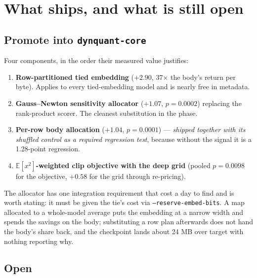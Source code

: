\documentclass[11pt]{article}
\newcommand{\x}{\texorpdfstring{$\times$}{x}}
\newcommand{\code}[1]{\texttt{#1}}
\begin{document}
\section{What ships, and what is still open}

\subsection{Promote into \code{dynquant-core}}

Four components, in the order their measured value justifies:

\begin{enumerate}[leftmargin=1.4em]
\item \textbf{Row-partitioned tied embedding} ($+2.90$, 37\x{} the body's return per byte). Applies
to every tied-embedding model and is nearly free in metadata.
\item \textbf{Gauss--Newton sensitivity allocator} ($+1.07$, $p = 0.0002$) replacing the
rank-product scorer. The cleanest substitution in the phase.
\item \textbf{Per-row body allocation} ($+1.04$, $p = 0.0001$) --- \emph{shipped together with its
shuffled control as a required regression test}, because without the signal it is a 1.28-point
regression.
\item \textbf{$\mathbb{E}[x^2]$-weighted clip objective with the deep grid} (pooled $p = 0.0098$
for the objective, $+0.58$ for the grid through re-pricing).
\end{enumerate}

The allocator has one integration requirement that cost a day to find and is worth stating: it must
be given the tie's cost via \code{--reserve-embed-bits}. A map allocated to a whole-model average
puts the embedding at a narrow width and spends the savings on the body; substituting a row plan
afterwards does not hand the body's share back, and the checkpoint lands about 24 MB over target
with nothing reporting why.

\subsection{Open}
\end{document}
